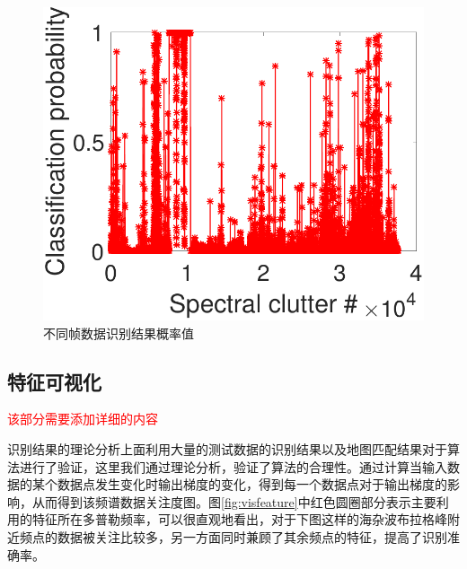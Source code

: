 \begin{figure}[!t]
	\centering
	\includegraphics[width=\textwidth]{figures/prob}
	\caption{不同帧数据识别结果概率值}
	\label{fig:prob}
\end{figure}
%
\subsection{特征可视化}
\textcolor{red}{该部分需要添加详细的内容}

识别结果的理论分析上面利用大量的测试数据的识别结果以及地图匹配结果对于算法进行了验证，这里我们通过理论分析，验证了算法的合理性。通过计算当输入数据的某个数据点发生变化时输出梯度的变化，得到每一个数据点对于输出梯度的影响，从而得到该频谱数据关注度图。图\ref{fig:visfeature}中红色圆圈部分表示主要利用的特征所在多普勒频率，可以很直观地看出，对于下图这样的海杂波布拉格峰附近频点的数据被关注比较多，另一方面同时兼顾了其余频点的特征，提高了识别准确率。 

